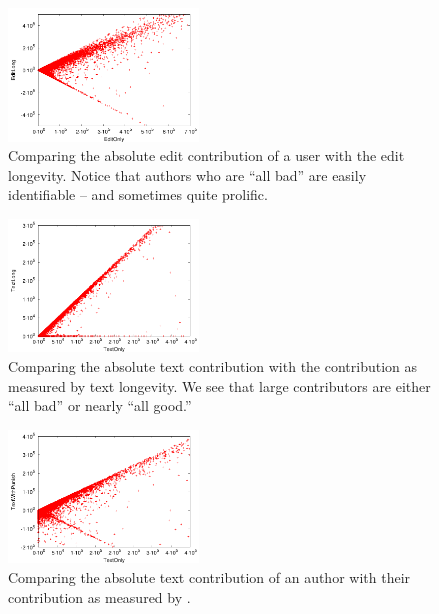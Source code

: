 \begin{figure}[t]
    \begin{center}
    \includegraphics[width=0.45\textwidth]{part-I10-contrib/graphs/score-zoom-editonly-editlong}
    \end{center}
    \caption[EditOnly vs EditLong]{
    	Comparing the absolute edit contribution of a user
	with the edit longevity.
	Notice that authors who are ``all bad''
	are easily identifiable -- and sometimes quite prolific.
    }
    \label{fig-zoom-editonly-editlong}
\end{figure}
%
\begin{figure}[t]
    \begin{center}
    \includegraphics[width=0.45\textwidth]{part-I10-contrib/graphs/score-zoom-textonly-textlong}
    \end{center}
    \caption[TextOnly vs TextLong]{
    	Comparing the absolute text contribution with the contribution
	as measured by text longevity.
	We see that large contributors are either ``all bad''
	or nearly ``all good.''
    }
    \label{fig-zoom-textonly-textlong}
\end{figure}
%
\begin{figure}[t]
    \begin{center}
    \includegraphics[width=0.45\textwidth]{part-I10-contrib/graphs/score-zoom-textonly-textwithpunish}
    \end{center}
    \caption[TextOnly vs TextWithPunish]{
    	Comparing the absolute text contribution of an author with
	their contribution as measured by \punish.
    }
    \label{fig-zoom-textonly-textwithpunish}
\end{figure}
